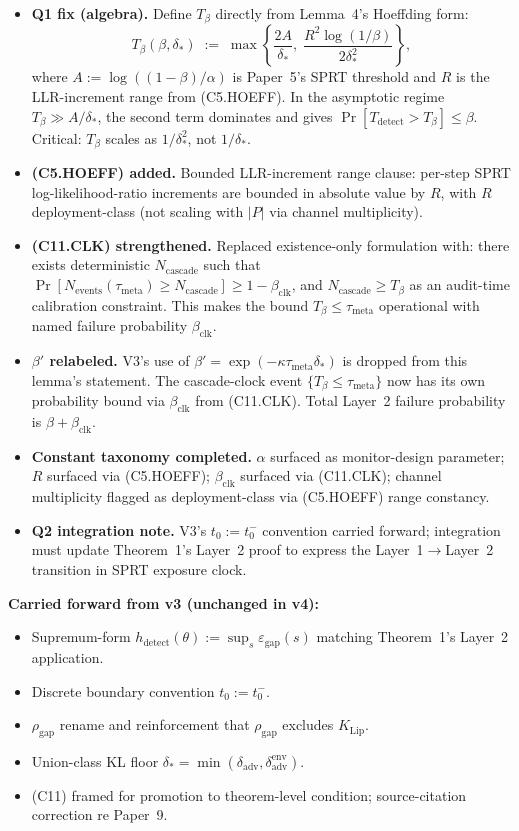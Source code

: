 \documentclass{article}
\newcommand{\deltaadv}{\delta_{\mathrm{adv}}}
\newcommand{\deltastar}{\delta_{*}}
\newcommand{\rhogap}{\rho_{\mathrm{gap}}}
\newcommand{\epsgap}{\varepsilon_{\mathrm{gap}}}
\newcommand{\Tbeta}{T_{\beta}}
\newcommand{\Ncasc}{N_{\mathrm{cascade}}}
\newcommand{\Nev}{N_{\mathrm{events}}}
\newcommand{\bclk}{\beta_{\mathrm{clk}}}
\begin{document}
\begin{itemize}
\item \textbf{Q1 fix (algebra).}  Define $\Tbeta$ directly from
  Lemma~4's Hoeffding form:
  \[
    \Tbeta(\beta, \deltastar) \;:=\;
    \max\!\left\{\frac{2A}{\deltastar},\;
    \frac{R^2 \log(1/\beta)}{2 \deltastar^2}\right\},
  \]
  where $A := \log((1-\beta)/\alpha)$ is Paper~5's SPRT threshold
  and $R$ is the LLR-increment range from (C5.HOEFF).  In the
  asymptotic regime $\Tbeta \gg A/\deltastar$, the second term
  dominates and gives $\Pr[T_{\mathrm{detect}} > \Tbeta] \leq
  \beta$.  Critical: $\Tbeta$ scales as $1/\deltastar^2$, not
  $1/\deltastar$.
\item \textbf{(C5.HOEFF) added.}  Bounded LLR-increment range
  clause: per-step SPRT log-likelihood-ratio increments are bounded
  in absolute value by $R$, with $R$ deployment-class (not scaling
  with $|P|$ via channel multiplicity).
\item \textbf{(C11.CLK) strengthened.}  Replaced existence-only
  formulation with: there exists deterministic $\Ncasc$ such that
  $\Pr[\Nev(\tau_{\mathrm{meta}}) \geq \Ncasc] \geq 1 - \bclk$, and
  $\Ncasc \geq \Tbeta$ as an audit-time calibration constraint.
  This makes the bound $\Tbeta \leq \tau_{\mathrm{meta}}$
  operational with named failure probability $\bclk$.
\item \textbf{$\beta'$ relabeled.}  V3's use of $\beta' = \exp(-\kappa
  \tau_{\mathrm{meta}} \deltastar)$ is dropped from this lemma's
  statement.  The cascade-clock event $\{\Tbeta \leq
  \tau_{\mathrm{meta}}\}$ now has its own probability bound via
  $\bclk$ from (C11.CLK).  Total Layer~2 failure probability is
  $\beta + \bclk$.
\item \textbf{Constant taxonomy completed.}  $\alpha$ surfaced as
  monitor-design parameter; $R$ surfaced via (C5.HOEFF); $\bclk$
  surfaced via (C11.CLK); channel multiplicity flagged as
  deployment-class via (C5.HOEFF) range constancy.
\item \textbf{Q2 integration note.}  V3's $t_0 := t_0^-$ convention
  carried forward; integration must update Theorem~1's Layer~2
  proof to express the Layer~1$\to$Layer~2 transition in SPRT
  exposure clock.
\end{itemize}

\textbf{Carried forward from v3 (unchanged in v4):}
\begin{itemize}
\item Supremum-form $h_{\mathrm{detect}}(\theta) := \sup_s
  \epsgap(s)$ matching Theorem~1's Layer~2 application.
\item Discrete boundary convention $t_0 := t_0^-$.
\item $\rhogap$ rename and reinforcement that $\rhogap$ excludes
  $K_{\mathrm{Lip}}$.
\item Union-class KL floor $\deltastar = \min(\deltaadv,
  \delta_{\mathrm{adv}}^{\mathrm{env}})$.
\item (C11) framed for promotion to theorem-level condition;
  source-citation correction re Paper~9.
\end{itemize}
\end{document}
